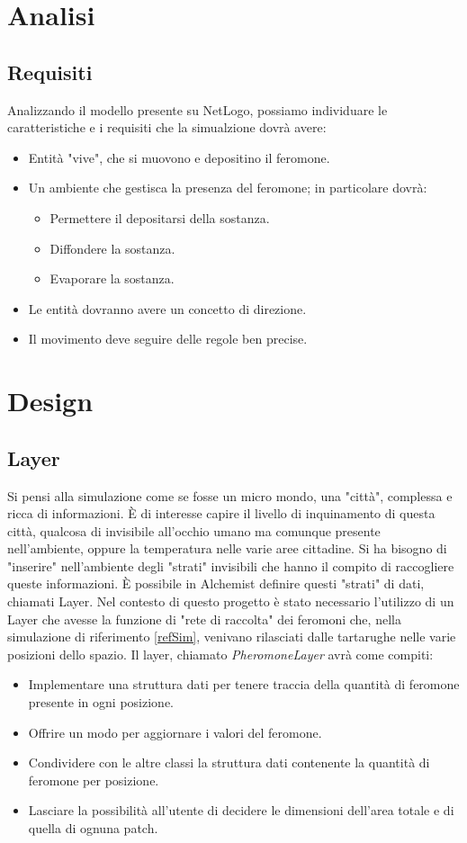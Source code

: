 \documentclass[12pt,a4paper,openright,twoside]{book}
\begin{document}
\chapter{Analisi}
\section{Requisiti}
Analizzando il modello presente su NetLogo\cite{wilensky1997netlogo}, possiamo individuare 
le caratteristiche e i requisiti che la simualzione dovrà avere:
\begin{itemize}
    \item Entità "vive", che si muovono e depositino il feromone.
    \item Un ambiente che gestisca la presenza del feromone; in particolare dovrà:
    \begin{itemize}
        \item Permettere il depositarsi della sostanza.
        \item Diffondere la sostanza.
        \item Evaporare la sostanza.
    \end{itemize}
    \item Le entità dovranno avere un concetto di direzione.
    \item Il movimento deve seguire delle regole ben precise.
\end{itemize}
\chapter{Design}

\section{Layer}
Si pensi alla simulazione come se fosse un micro mondo, una "città", complessa
e ricca di informazioni. È di interesse capire il livello di inquinamento di questa città, qualcosa di invisibile
all'occhio umano ma comunque presente nell'ambiente, oppure la temperatura nelle varie aree cittadine. Si ha bisogno
di "inserire" nell'ambiente degli "strati" invisibili che hanno il compito di raccogliere queste informazioni.
È possibile in Alchemist definire questi "strati" di dati, chiamati Layer.
\newline
Nel contesto di questo progetto è stato necessario l'utilizzo di un Layer che avesse la funzione di "rete di raccolta" 
dei feromoni che, nella simulazione di riferimento \ref{refSim}, venivano rilasciati dalle tartarughe nelle varie posizioni
dello spazio. 
Il layer, chiamato \textit{PheromoneLayer} avrà come compiti:
\begin{itemize}
    \item Implementare una struttura dati per tenere traccia della quantità di feromone presente in ogni posizione.
    \item Offrire un modo per aggiornare i valori del feromone.
    \item Condividere con le altre classi la struttura dati contenente la quantità di feromone per posizione.
    \item Lasciare la possibilità all'utente di decidere le dimensioni dell'area totale e di quella di ognuna patch.
\end{itemize}
\end{document}
